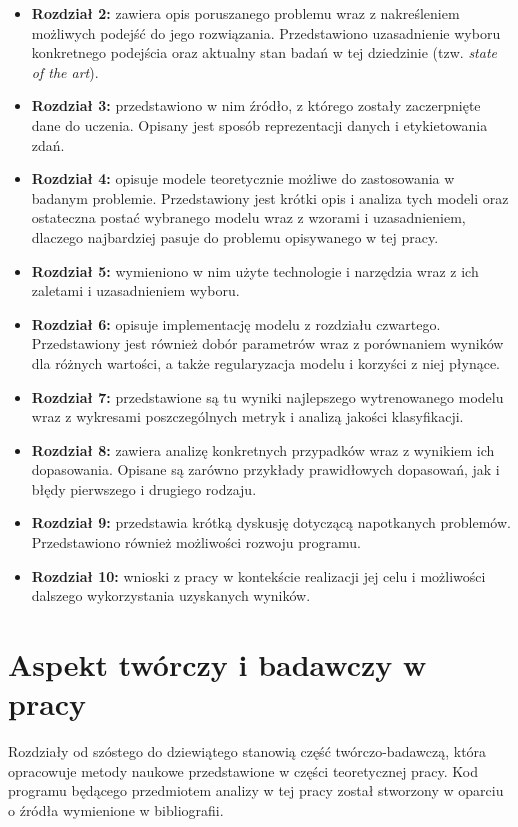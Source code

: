 \begin{itemize}
  \item \textbf{Rozdział 2:} zawiera opis poruszanego problemu wraz z nakreśleniem możliwych podejść do jego rozwiązania. Przedstawiono uzasadnienie wyboru konkretnego podejścia oraz aktualny stan badań w tej dziedzinie (tzw. \textit{state of the art}).
  \item \textbf{Rozdział 3:} przedstawiono w nim źródło, z którego zostały zaczerpnięte dane do uczenia. Opisany jest sposób reprezentacji danych i etykietowania zdań. 
  \item \textbf{Rozdział 4:} opisuje modele teoretycznie możliwe do zastosowania w badanym problemie. Przedstawiony jest krótki opis i analiza tych modeli oraz ostateczna postać wybranego modelu wraz z wzorami i uzasadnieniem, dlaczego najbardziej pasuje do problemu opisywanego w tej pracy.
  \item \textbf{Rozdział 5:} wymieniono w nim użyte technologie i narzędzia wraz z ich zaletami i uzasadnieniem wyboru. 
  \item \textbf{Rozdział 6:} opisuje implementację modelu z rozdziału czwartego. Przedstawiony jest również dobór parametrów wraz z porównaniem wyników dla różnych wartości, a także regularyzacja modelu i korzyści z niej płynące.
  \item \textbf{Rozdział 7:} przedstawione są tu wyniki najlepszego wytrenowanego modelu wraz z wykresami poszczególnych metryk i analizą jakości klasyfikacji.
  \item \textbf{Rozdział 8:} zawiera analizę konkretnych przypadków wraz z wynikiem ich dopasowania. Opisane są zarówno przykłady prawidłowych dopasowań, jak i błędy pierwszego i drugiego rodzaju.
  \item \textbf{Rozdział 9:} przedstawia krótką dyskusję dotyczącą napotkanych problemów. Przedstawiono również możliwości rozwoju programu. 
  \item \textbf{Rozdział 10:} wnioski z pracy w kontekście realizacji jej celu i możliwości dalszego wykorzystania uzyskanych wyników.
\end{itemize}

\section{Aspekt twórczy i badawczy w pracy}
\label{sec:tworczosc}

Rozdziały od szóstego do dziewiątego stanowią część twórczo-badawczą, która opracowuje metody naukowe przedstawione w części teoretycznej pracy. Kod programu będącego przedmiotem analizy w tej pracy został stworzony w oparciu o źródła wymienione w bibliografii.


